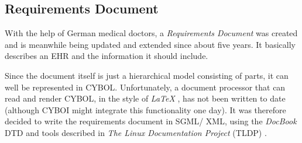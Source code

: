 %
%
%
%
%
%
%

\subsection{Requirements Document}
\label{requirements_document_heading}

With the help of German medical doctors, a \emph{Requirements Document}
\cite{resmedicinae2001} was created and is meanwhile being updated and extended
since about five years. It basically describes an EHR and the information it
should include.

Since the document itself is just a hierarchical model consisting of parts, it
can well be represented in CYBOL. Unfortunately, a document processor that can
read and render CYBOL, in the style of \emph{LaTeX} \cite{latex}, has not been
written to date (although CYBOI might integrate this functionality one day). It
was therefore decided to write the requirements document in SGML/ XML, using
the \emph{DocBook} DTD \cite{docbook} and tools described in
\emph{The Linux Documentation Project} (TLDP) \cite{linuxdoc}.
